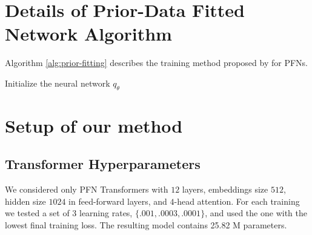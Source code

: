 \documentclass{article}
\begin{document}
\section{Details of Prior-Data Fitted Network Algorithm} %
\label{app:pfn}
Algorithm \ref{alg:prior-fitting} describes the training method proposed by \citet{muller-iclr22a} for PFNs.

\begin{algorithm}[H]
\SetAlgoLined
{}
 Initialize the neural network $q_\theta$\;
 \caption{Meta-Training of a PFN \citep{muller-iclr22a}}
 \label{alg:prior-fitting}
\end{algorithm}
\section{Setup of our method}
\label{sec:our_setup}

\subsection{Transformer Hyperparameters}
We considered only PFN Transformers with $12$ layers, embeddings size $512$, hidden size $1024$ in feed-forward layers, and $4$-head attention. For each training we tested a set of 3 learning rates, $\{.001,.0003,.0001\}$, and used the one with the lowest final training loss. The resulting model contains  25.82 M parameters.
\end{document}
